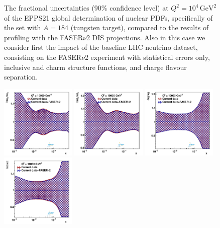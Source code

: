 \begin{figure}[t]
\caption{The fractional uncertainties (90\% confidence level) at $Q^2 = 10^4 \, \textrm{GeV}^2$ of the EPPS21 global determination of nuclear PDFs,
specifically of the set with $A=184$ (tungsten target), compared to the results of profiling with the FASER$\nu$2 DIS projections.
%
Also in this case we consider first the impact of the baseline LHC neutrino dataset, consisting
on the FASER$\nu$2 experiment
with statistical errors only, inclusive and charm structure functions,  and charge flavour
separation.
%
}
\label{fig:profiling_baseline_nuclear}
\end{figure}
\begin{figure}[t]
\centering
\includegraphics[width=0.32\textwidth]{plots/nuclear_fasernu2/inclusive+charm_chargediscrimination/systVar05_FASERv2_q2_10000_pdf_uv_ratio.pdf}
\includegraphics[width=0.32\textwidth]{plots/nuclear_fasernu2/inclusive+charm_chargediscrimination/systVar05_FASERv2_q2_10000_pdf_dv_ratio.pdf}
\includegraphics[width=0.32\textwidth]{plots/nuclear_fasernu2/inclusive+charm_chargediscrimination/systVar05_FASERv2_q2_10000_pdf_g_ratio.pdf}\\
\includegraphics[width=0.32\textwidth]{plots/nuclear_fasernu2/inclusive+charm_chargediscrimination/systVar05_FASERv2_q2_10000_pdf_Sea_ratio.pdf}

\end{figure}
